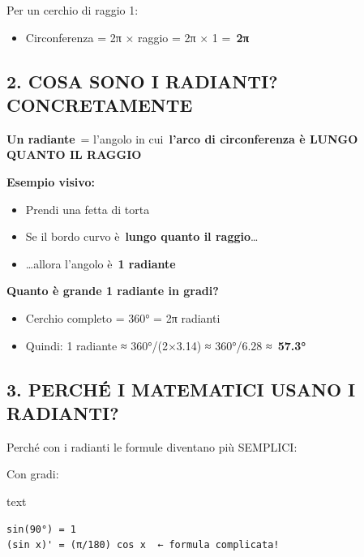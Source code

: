 \documentclass[
]{article}
\providecommand{\tightlist}{%
  \setlength{\itemsep}{0pt}\setlength{\parskip}{0pt}}
\begin{document}
Per un cerchio di raggio 1:

\begin{itemize}
\tightlist
\item
  Circonferenza = 2π × raggio = 2π × 1 =~\textbf{2π}
\end{itemize}

\hypertarget{cosa-sono-i-radianti-concretamente}{%
\subsection{\texorpdfstring{\textbf{2. COSA SONO I RADIANTI? CONCRETAMENTE}}{2. COSA SONO I RADIANTI? CONCRETAMENTE}}\label{cosa-sono-i-radianti-concretamente}}

\textbf{Un radiante}~= l'angolo in cui~\textbf{l'arco di circonferenza è LUNGO QUANTO IL RAGGIO}

\textbf{Esempio visivo:}

\begin{itemize}
\tightlist
\item
  Prendi una fetta di torta
\item
  Se il bordo curvo è~\textbf{lungo quanto il raggio}\ldots{}
\item
  \ldots allora l'angolo è~\textbf{1 radiante}
\end{itemize}

\textbf{Quanto è grande 1 radiante in gradi?}

\begin{itemize}
\tightlist
\item
  Cerchio completo = 360° = 2π radianti
\item
  Quindi: 1 radiante ≈ 360°/(2×3.14) ≈ 360°/6.28 ≈~\textbf{57.3°}
\end{itemize}

\hypertarget{perchuxe9-i-matematici-usano-i-radianti}{%
\subsection{\texorpdfstring{\textbf{3. PERCHÉ I MATEMATICI USANO I RADIANTI?}}{3. PERCHÉ I MATEMATICI USANO I RADIANTI?}}\label{perchuxe9-i-matematici-usano-i-radianti}}

Perché con i radianti le formule diventano più SEMPLICI:

Con gradi:

text

\begin{verbatim}
sin(90°) = 1
(sin x)' = (π/180) cos x  ← formula complicata!
\end{verbatim}
\end{document}
